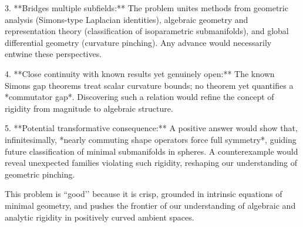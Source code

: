 3. **Bridges multiple subfields:**  
   The problem unites methods from geometric analysis (Simons-type Laplacian identities), algebraic geometry and representation theory (classification of isoparametric submanifolds), and global differential geometry (curvature pinching).  Any advance would necessarily entwine these perspectives.

4. **Close continuity with known results yet genuinely open:**  
   The known Simons gap theorems treat scalar curvature bounds; no theorem yet quantifies a *commutator gap*.  Discovering such a relation would refine the concept of rigidity from magnitude to algebraic structure.

5. **Potential transformative consequence:**  
   A positive answer would show that, infinitesimally, *nearly commuting shape operators force full symmetry*, guiding future classification of minimal submanifolds in spheres.  A counterexample would reveal unexpected families violating such rigidity, reshaping our understanding of geometric pinching.

This problem is “good’’ because it is crisp, grounded in intrinsic equations of minimal geometry, and pushes the frontier of our understanding of algebraic and analytic rigidity in positively curved ambient spaces.